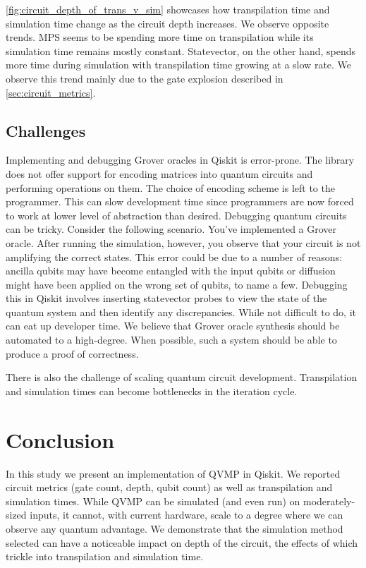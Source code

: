 \documentclass[11pt]{article}
\theoremstyle{definition}
\theoremstyle{remark}
\begin{document}
\cref{fig:circuit_depth_of_trans_v_sim} showcases how transpilation
time and simulation time change as the circuit depth increases. We observe
opposite trends. MPS seems to be spending more time on transpilation while its
simulation time remains mostly constant. Statevector, on the other hand,
spends more time during simulation with transpilation time growing at a slow
rate. We observe this trend mainly due to the gate explosion described in
\cref{sec:circuit_metrics}.

\subsection{Challenges}

Implementing and debugging Grover oracles in Qiskit is error-prone. The library
does not offer support for encoding matrices into quantum circuits and
performing operations on them.  The choice of encoding scheme is left to the
programmer. This can slow development time since programmers are now forced to
work at lower level of abstraction than desired. Debugging quantum circuits can
be tricky. Consider the following scenario. You've implemented a Grover oracle.
After running the simulation, however, you observe that your circuit is not
amplifying the correct states. This error could be due to a number of reasons:
ancilla qubits may have become entangled with the input qubits or diffusion
might have been applied on the wrong set of qubits, to name a few. Debugging
this in Qiskit involves inserting statevector probes to view the state of the
quantum system and then identify any discrepancies.  While not difficult to do,
it can eat up developer time. We believe that Grover oracle synthesis should be
automated to a high-degree. When possible, such a system should be able to
produce a proof of correctness.

There is also the challenge of scaling quantum circuit development.
Transpilation and simulation times can become bottlenecks in the iteration
cycle.

\section{Conclusion}

In this study we present an implementation of QVMP in Qiskit. We reported
circuit metrics (gate count, depth, qubit count) as well as transpilation and
simulation times. While QVMP can be simulated (and even run) on moderately-sized
inputs, it cannot, with current hardware, scale to a degree where we can
observe any quantum advantage. We demonstrate that the simulation method
selected can have a noticeable impact on depth of the circuit, the effects of
which trickle into transpilation and simulation time.
\end{document}
